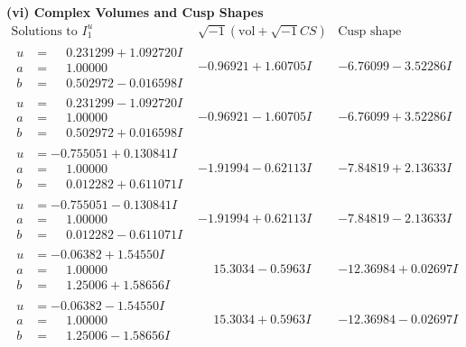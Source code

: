 \documentclass[1p]{elsarticle_modified}
\theoremstyle{definition}
\newcommand{\I}{\sqrt{-1}}
\begin{document}
\newpage\flushleft \textbf{(vi) Complex Volumes and Cusp Shapes}
$$\begin{array}{c|c|c}  
\text{Solutions to }I^u_{1}& \I (\text{vol} + \sqrt{-1}CS) & \text{Cusp shape}\\
 \hline 
\begin{aligned}
u &= \phantom{-}0.231299 + 1.092720 I \\
a &= \phantom{-}1.00000\phantom{ +0.000000I} \\
b &= \phantom{-}0.502972 - 0.016598 I\end{aligned}
 & -0.96921 + 1.60705 I & -6.76099 - 3.52286 I \\ \hline\begin{aligned}
u &= \phantom{-}0.231299 - 1.092720 I \\
a &= \phantom{-}1.00000\phantom{ +0.000000I} \\
b &= \phantom{-}0.502972 + 0.016598 I\end{aligned}
 & -0.96921 - 1.60705 I & -6.76099 + 3.52286 I \\ \hline\begin{aligned}
u &= -0.755051 + 0.130841 I \\
a &= \phantom{-}1.00000\phantom{ +0.000000I} \\
b &= \phantom{-}0.012282 + 0.611071 I\end{aligned}
 & -1.91994 - 0.62113 I & -7.84819 + 2.13633 I \\ \hline\begin{aligned}
u &= -0.755051 - 0.130841 I \\
a &= \phantom{-}1.00000\phantom{ +0.000000I} \\
b &= \phantom{-}0.012282 - 0.611071 I\end{aligned}
 & -1.91994 + 0.62113 I & -7.84819 - 2.13633 I \\ \hline\begin{aligned}
u &= -0.06382 + 1.54550 I \\
a &= \phantom{-}1.00000\phantom{ +0.000000I} \\
b &= \phantom{-}1.25006 + 1.58656 I\end{aligned}
 & \phantom{-}15.3034 - 0.5963 I & -12.36984 + 0.02697 I \\ \hline\begin{aligned}
u &= -0.06382 - 1.54550 I \\
a &= \phantom{-}1.00000\phantom{ +0.000000I} \\
b &= \phantom{-}1.25006 - 1.58656 I\end{aligned}
 & \phantom{-}15.3034 + 0.5963 I & -12.36984 - 0.02697 I \\ \hline\begin{aligned}

\end{aligned}
\end{array}$$
\end{document}
